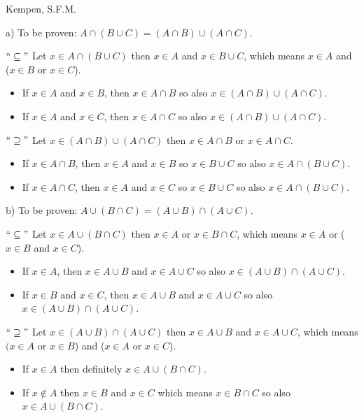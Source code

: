 \begin{solution}[1.1]{Kempen, S.F.M.} 
    
\noindent a) To be proven: $A\cap (B\cup C) = (A\cap B) \cup (A\cap C)$.

\noindent $``\subseteq"$ Let $x \in A\cap(B\cup C)$ then $x\in A$ and $x\in B\cup C$, which means $x\in A$ and ($x\in B$ or $x\in C$). 
\begin{itemize}
	\item If $x\in A$ and $x\in B$, then $x\in A\cap B$ so also $x\in (A\cap B) \cup (A\cap C)$.
	\item If $x\in A$ and $x\in C$, then $x\in A\cap C$ so also $x\in (A\cap B) \cup (A\cap C)$.
\end{itemize}

\noindent $``\supseteq"$ Let $x\in (A\cap B) \cup (A\cap C)$ then $x\in A\cap B$ or $x\in A\cap C$.
\begin{itemize}
	\item If $x\in A\cap B$, then $x\in A$ and $x\in B$ so $x\in B\cup C$ so also $x\in A\cap (B \cup C)$.
	\item If $x\in A\cap C$, then $x\in A$ and $x\in C$ so $x\in B\cup C$ so also $x\in A\cap (B \cup C)$.
\end{itemize}

\noindent b) To be proven: $A\cup(B\cap C) = (A\cup B) \cap (A\cup C)$.

\noindent $``\subseteq"$ Let $x\in A\cup (B\cap C)$ then $x\in A$ or $x\in B\cap C$, which means $x\in A$ or ($x\in B$ and $x\in C$). 
\begin{itemize}
	\item If $x\in A$, then $x\in A\cup B$ and $x\in A\cup C$ so also $x\in (A\cup B) \cap (A\cup C)$.
	\item If $x\in B$ and $x\in C$, then $x\in A\cup B$ and $x\in A\cup C$ so also $x\in (A\cup B) \cap (A\cup C)$.
\end{itemize}
\noindent $``\supseteq"$ Let $x\in (A\cup B) \cap (A\cup C)$ then $x\in A\cup B$ and $x\in A\cup C$, which means $(x\in A$ or $x\in B$) and ($x\in A$ or $x\in C$). 
\begin{itemize}
	\item If $x\in A$ then definitely $x\in A\cup (B\cap C)$.
	\item If $x\notin A$ then $x\in B$ and $x\in C$ which means $x\in B\cap C$ so also $x\in A\cup (B\cap C)$.
\end{itemize}
\end{solution}


